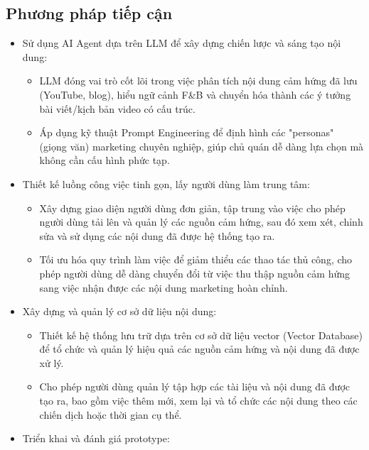 \subsection{Phương pháp tiếp
cận}\label{phux1b0ux1a1ng-phuxe1p-tiux1ebfp-cux1eadn}

\begin{itemize}
\item
  Sử dụng AI Agent dựa trên LLM để xây dựng chiến lược và sáng tạo nội
  dung:

  \begin{itemize}
  \item
    LLM đóng vai trò cốt lõi trong việc phân tích nội dung cảm hứng đã
    lưu (YouTube, blog), hiểu ngữ cảnh F\&B và chuyển hóa thành các ý
    tưởng bài viết/kịch bản video có cấu trúc.
  \item
    Áp dụng kỹ thuật Prompt Engineering để định hình các "personas"
    (giọng văn) marketing chuyên nghiệp, giúp chủ quán dễ dàng lựa chọn
    mà không cần cấu hình phức tạp.
  \end{itemize}
\item
  Thiết kế luồng công việc tinh gọn, lấy người dùng làm trung tâm:

  \begin{itemize}
  \item
    Xây dựng giao diện người dùng đơn giản, tập trung vào việc cho phép
    người dùng tải lên và quản lý các nguồn cảm hứng, sau đó xem xét,
    chỉnh sửa và sử dụng các nội dung đã được hệ thống tạo ra.
  \item
    Tối ưu hóa quy trình làm việc để giảm thiểu các thao tác thủ công,
    cho phép người dùng dễ dàng chuyển đổi từ việc thu thập nguồn cảm
    hứng sang việc nhận được các nội dung marketing hoàn chỉnh.
  \end{itemize}
\item
  Xây dựng và quản lý cơ sở dữ liệu nội dung:

  \begin{itemize}
  \item
    Thiết kế hệ thống lưu trữ dựa trên cơ sở dữ liệu vector (Vector
    Database) để tổ chức và quản lý hiệu quả các nguồn cảm hứng và nội
    dung đã được xử lý.
  \item
    Cho phép người dùng quản lý tập hợp các tài liệu và nội dung đã được
    tạo ra, bao gồm việc thêm mới, xem lại và tổ chức các nội dung theo
    các chiến dịch hoặc thời gian cụ thể.
  \end{itemize}
\item
  Triển khai và đánh giá prototype:


\end{itemize}
